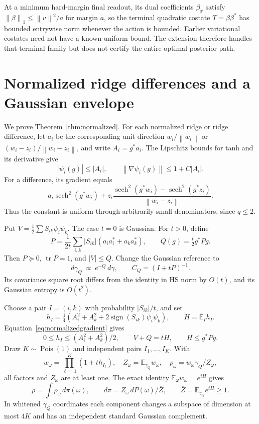 \documentclass[11pt]{article}
\newcommand{\E}{\mathbb E}
\newcommand{\norm}[1]{\left\lVert #1\right\rVert}
\begin{document}
At a minimum hard-margin final readout, its dual coefficients $\beta_x$ satisfy $\norm\beta_1\le\norm v^2/a$ for margin $a$, so the terminal quadratic costate $T=\beta\beta^*$ has bounded entrywise norm whenever the action is bounded. Earlier variational costates need not have a known uniform bound. The extension therefore handles that terminal family but does not certify the entire optimal posterior path.

\section{Normalized ridge differences and a Gaussian envelope}
\label{sec:normalized}
We prove Theorem~\ref{thm:normalized}. For each normalized ridge or ridge difference, let $a_i$ be the corresponding unit direction $w_i/\norm{w_i}$ or $(w_i-z_i)/\norm{w_i-z_i}$, and write $A_i=g^*a_i$. The Lipschitz bounds for tanh and its derivative give
\begin{equation}
 |\psi_i(g)|\le|A_i|,\qquad
 \norm{\nabla\psi_i(g)}\le1+C|A_i|.
 \label{eq:normalizedgradient}
\end{equation}
For a difference, its gradient equals
\[
 a_i\operatorname{sech}^2(g^*w_i)+
 z_i\frac{\operatorname{sech}^2(g^*w_i)-\operatorname{sech}^2(g^*z_i)}{\norm{w_i-z_i}}.
\]
Thus the constant is uniform through arbitrarily small denominators, since $q\le2$.

Put $V=\tfrac12\sum S_{ik}\psi_i\psi_k$. The case $t=0$ is Gaussian. For $t>0$, define
\[
 P=\frac1{2t}\sum_{i,k}|S_{ik}|(a_ia_i^*+a_ka_k^*),\qquad
 Q(g)=\tfrac t2g^*Pg.
\]
Then $P\succeq0$, $\operatorname{tr}P=1$, and $|V|\le Q$. Change the Gaussian reference to
\[
 d\gamma_Q\ \propto\ e^{-Q}\,d\gamma,
 \qquad C_Q=(I+tP)^{-1}.
\]
Its covariance square root differs from the identity in HS norm by $O(t)$, and its Gaussian entropy is $O(t^2)$.

Choose a pair $I=(i,k)$ with probability $|S_{ik}|/t$, and set
\[
 h_I=\tfrac14(A_i^2+A_k^2+2\operatorname{sign}(S_{ik})\psi_i\psi_k),
 \qquad H=\E_Ih_I.
\]
Equation~\eqref{eq:normalizedgradient} gives
\begin{equation}
 0\le h_I\le(A_i^2+A_k^2)/2,\qquad
 V+Q=tH,\qquad H\le g^*Pg.
 \label{eq:envelope}
\end{equation}
Draw $K\sim\operatorname{Pois}(1)$ and independent pairs $I_1,\ldots,I_K$. With
\[
 w_\omega=\prod_{\ell=1}^K(1+th_{I_\ell}),\quad
 Z_\omega=\E_{\gamma_Q}w_\omega,\quad
 \rho_\omega=w_\omega\gamma_Q/Z_\omega,
\]
all factors and $Z_\omega$ are at least one. The exact identity $\E_\omega w_\omega=e^{tH}$ gives
\begin{equation}
 \rho=\int\rho_\omega\,d\pi(\omega),\qquad
 d\pi=Z_\omega\,dP(\omega)/\overline Z,\qquad
 \overline Z=\E_{\gamma_Q}e^{tH}\ge1.
 \label{eq:normalizedmixture}
\end{equation}
In whitened $\gamma_Q$ coordinates each component changes a subspace of dimension at most $4K$ and has an independent standard Gaussian complement.
\end{document}
